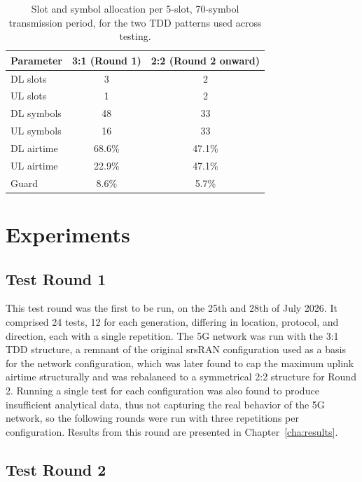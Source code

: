 \begin{table}[htbp]
    \centering
    \begin{tabular}{|l|c|c|}
        \hline
        \textbf{Parameter} & \textbf{3:1 (Round 1)} & \textbf{2:2 (Round 2 onward)} \\
        \hline
        DL slots & 3 & 2 \\
        \hline
        UL slots & 1 & 2 \\
        \hline
        DL symbols & 48 & 33 \\
        \hline
        UL symbols & 16 & 33 \\
        \hline
        DL airtime & 68.6\% & 47.1\% \\
        \hline
        UL airtime & 22.9\% & 47.1\% \\
        \hline
        Guard & 8.6\% & 5.7\% \\
        \hline
    \end{tabular}
    \caption{Slot and symbol allocation per 5-slot, 70-symbol transmission period, for the two TDD patterns used across testing.}
    \label{tab:tdd-comparison}
\end{table}

\section{Experiments}
\label{sec:experiments}

\subsection{Test Round 1}
\label{sec:test-round-1}

This test round was the first to be run, on the 25th and 28th of July 2026. It comprised 24 tests, 12 for each generation, differing in location, protocol, and direction, each with a single repetition. The 5G network was run with the 3:1 \gls{TDD} structure, a remnant of the original srsRAN configuration used as a basis for the network configuration, which was later found to cap the maximum uplink airtime structurally and was rebalanced to a symmetrical 2:2 structure for Round 2. Running a single test for each configuration was also found to produce insufficient analytical data, thus not capturing the real behavior of the 5G network, so the following rounds were run with three repetitions per configuration. Results from this round are presented in Chapter~\ref{cha:results}.

\subsection{Test Round 2}
\label{sec:test-round-2}

